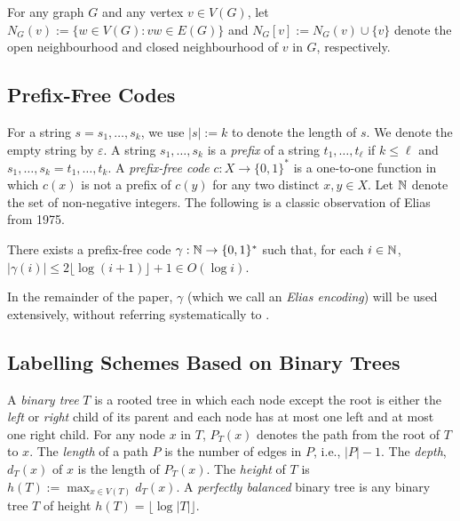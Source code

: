\documentclass[kpfonts]{patmorin}
\let\le\leqslant
\begin{document}
For any graph $G$ and any vertex $v\in V(G)$, let $N_G(v):=\{w\in V(G): vw\in E(G)\}$ and $N_G[v]:=N_G(v)\cup\{v\}$ denote the open neighbourhood and closed neighbourhood of $v$ in $G$, respectively.

\subsection{Prefix-Free Codes}

For a string $s=s_1,\ldots,s_k$, we use $|s|:=k$ to denote the length of $s$. 
We denote the empty string by $\varepsilon$. 
A string $s_1,\ldots,s_k$ is a \emph{prefix} of a string $t_1,\ldots,t_\ell$ if $k\le \ell$ and $s_1,\ldots,s_k=t_1,\ldots,t_k$.  A \emph{prefix-free code} $c:X\to\{0,1\}^*$ is a one-to-one function in which $c(x)$ is not a prefix of $c(y)$ for any two distinct $x,y\in X$.  Let $\mathbb{N}$ denote the set of non-negative integers.  The following is a classic observation of Elias from 1975.


\begin{lem}
    There exists a prefix-free code $\gamma:\mathbb{N}\to\{0,1\}^*$ such that, for each $i\in\mathbb{N}$, $|\gamma(i)|\le 2\lfloor\log(i+1)\rfloor + 1\in O(\log i)$.
  \end{lem}

  In the remainder of the paper, $\gamma$ (which we call an \emph{Elias encoding}) will be used extensively, without referring systematically to .

\subsection{Labelling Schemes Based on Binary Trees}

A \emph{binary tree} $T$ is a rooted tree in which each node except the root is either the \emph{left} or \emph{right} child of its parent and each node has at most one left and at most one right child.  For any node $x$ in $T$, $P_T(x)$ denotes the path from the root of $T$ to $x$.  The \emph{length} of a path $P$ is the number of edges in $P$, i.e., $|P|-1$.  The \emph{depth}, $d_T(x)$ of $x$ is the length of $P_T(x)$.  The \emph{height} of $T$ is $h(T):=\max_{x\in V(T)} d_T(x)$.  A \emph{perfectly balanced} binary tree is any binary tree $T$ of height $h(T)=\lfloor\log|T|\rfloor$.
\end{document}
